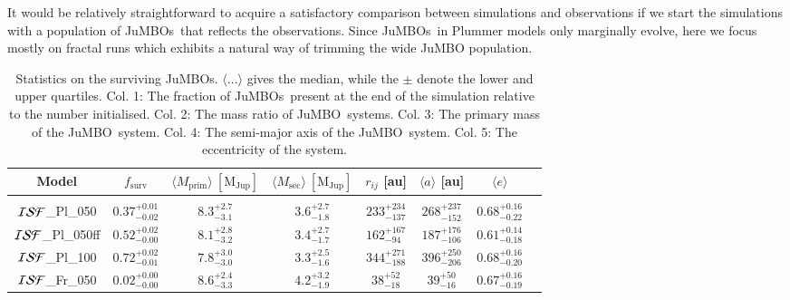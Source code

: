 \documentclass[submission,phys]{lib/SciPost}
\newcommand{\jumbo}{\mbox{JuMBO}}
\newcommand{\jumbos}{\mbox{JuMBOs}}
\begin{document}
It would be relatively straightforward to acquire a satisfactory comparison
between simulations and observations if we start the simulations with
a population of \jumbos\, that reflects the observations. Since \jumbos\, in
Plummer models only marginally evolve, here we focus mostly on fractal runs 
which exhibits a natural way of trimming the wide JuMBO population.
      
\begin{table}
         \caption{Statistics on the surviving \jumbos. $\langle
           ...\rangle$ gives the median, while the $\pm$ denote
           the lower and upper quartiles. Col. 1: The fraction of
           \jumbos\, present at the end of the simulation relative to
           the number initialised. Col. 2: The mass ratio of \jumbo\, systems. 
           Col. 3: The primary mass of the \jumbo\, system. Col. 4: The semi-major
           axis of the \jumbo\, system. Col. 5: The eccentricity of
           the system.
           }
        \label{Tab:SF_Res}
        \centering 
        \begin{tabular}{c c c c c c c c}
        \hline\hline
        Model & $f_{\mathrm{surv}}$ & $\langle M_{\mathrm{prim}} \rangle\ [\mathrm{M_{\mathrm{Jup}}}]$ & $\langle M_{\mathrm{sec}} \rangle\ [\mathrm{M_{\mathrm{Jup}}}]$ & $r_{ij}$ [au] &$\langle a \rangle$ [au] & $\langle e \rangle$\\
        \hline \vspace{-0.75em}\\ 
           ${\cal ISF}$\_Pl\_050     & $0.37^{+0.01}_{-0.02}$ & $8.3^{+2.7}_{-3.1}$ & $3.6^{+2.7}_{-1.8}$ & $233^{+234}_{-137}$ & $268^{+237}_{-152}$ & $0.68^{+0.16}_{-0.22}$ \vspace{0.25em}\\
           ${\cal ISF}$\_Pl\_050ff   & $0.52^{+0.02}_{-0.00}$ & $8.1^{+2.8}_{-3.2}$ & $3.4^{+2.7}_{-1.7}$ & $162^{+167}_{-94}$ & $187^{+176}_{-106}$ & $0.61^{+0.14}_{-0.18}$ \vspace{0.25em}\\
           ${\cal ISF}$\_Pl\_100      & $0.72^{+0.02}_{-0.01}$ & $7.8^{+3.0}_{-3.0}$ & $3.3^{+2.5}_{-1.6}$ & $344^{+271}_{-188}$ & $396^{+250}_{-206}$ & $0.68^{+0.16}_{-0.20}$ \vspace{0.25em}\\
           ${\cal ISF}$\_Fr\_050     & $0.02^{+0.00}_{-0.00}$ & $8.6^{+2.4}_{-3.3}$ & $4.2^{+3.2}_{-1.9}$ & $38^{+52}_{-18}$ & $39^{+50}_{-16}$ & $0.67^{+0.16}_{-0.19}$ \vspace{0.25em}\\

\end{tabular}
\end{table}
\end{document}
